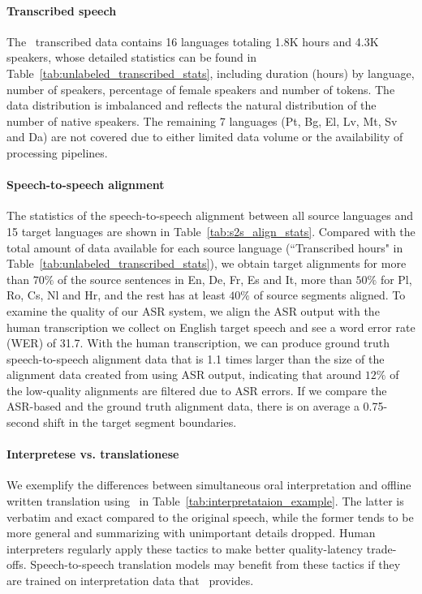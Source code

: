 \paragraph{Transcribed speech} The \vp~transcribed data contains 16 languages totaling 1.8K hours and 4.3K speakers, whose detailed statistics can be found in Table~\ref{tab:unlabeled_transcribed_stats}, including duration (hours) by language, number of speakers, percentage of female speakers and number of tokens. The data distribution is imbalanced and reflects the natural distribution of the number of native speakers. The remaining 7 languages (Pt, Bg, El, Lv, Mt, Sv and Da) are not covered due to either limited data volume or the availability of processing pipelines.

\paragraph{Speech-to-speech alignment} The statistics of the speech-to-speech alignment between all source languages and 15 target languages are shown in Table~\ref{tab:s2s_align_stats}. Compared with the total amount of data available for each source language (``Transcribed hours" in Table~\ref{tab:unlabeled_transcribed_stats}), we obtain target alignments for more than $70\%$ of the source sentences in En, De, Fr, Es and It, more than $50\%$ for Pl, Ro, Cs, Nl and Hr, and the rest has at least $40\%$ of source segments aligned. To examine the quality of our ASR system, we align the ASR output with the human transcription we collect on English target speech and see a word error rate (WER) of 31.7. With the human transcription, we can produce ground truth speech-to-speech alignment data that is 1.1 times larger than the size of the alignment data created from using ASR output, indicating that around $12\%$ of the low-quality alignments are filtered due to ASR errors. If we compare the ASR-based and the ground truth alignment data, there is on average a 0.75-second shift in the target segment boundaries.

\paragraph{Interpretese vs. translationese} We exemplify the differences between simultaneous oral interpretation and offline written translation using \vp~in Table~\ref{tab:interpretataion_example}. The latter is verbatim and exact compared to the original speech, while the former tends to be more general and summarizing with unimportant details dropped. Human interpreters regularly apply these tactics to make better quality-latency trade-offs. Speech-to-speech translation models may benefit from these tactics if they are trained on interpretation data that \vp~provides.

